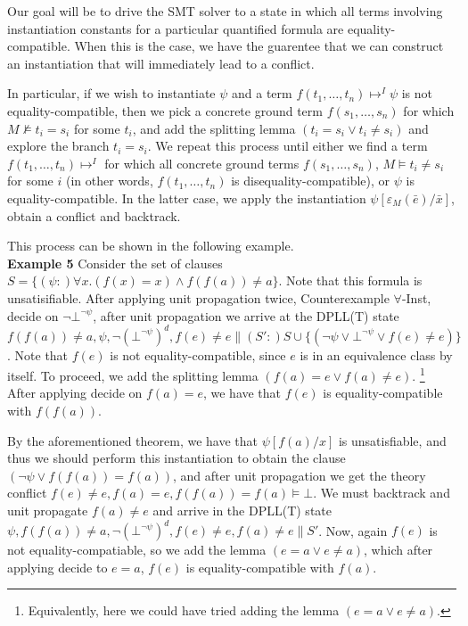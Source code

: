 \documentclass{llncs}
\begin{document}
Our goal will be to drive the SMT solver to a state in which all terms involving instantiation constants for a particular quantified formula are equality-compatible.
When this is the case, we have the guarentee that we can construct an instantiation that will immediately lead to a conflict.

In particular, if we wish to instantiate $\psi$ and a term $f( t_1, \ldots, t_n ) \mapsto^I \psi$ is not equality-compatible, then we pick a concrete ground term $f( s_1, \ldots, s_n )$ for which $M \not\models t_i = s_i$ for some $t_i$, and add the splitting lemma $( t_i = s_i \vee t_i \neq s_i )$ and explore the branch $t_i = s_i$.
We repeat this process until either we find a term $f( t_1, \ldots, t_n ) \mapsto^I$ for which all concrete ground terms $f( s_1, \ldots, s_n )$, $M \models t_i \neq s_i$ for some $i$ (in other words, $f( t_1, \ldots, t_n )$ is disequality-compatible), or $\psi$ is equality-compatible.
In the latter case, we apply the instantiation $\psi[\varepsilon_M(\bar{e})/\bar{x}]$, obtain a conflict and backtrack.

This process can be shown in the following example. \\

{\bf Example 5}
Consider the set of clauses $S = \{ (\psi :)\forall x. (f( x ) = x) \wedge f( f( a ) ) \neq a \}$.  Note that this formula is unsatisifiable.
After applying unit propagation twice, Counterexample $\forall$-Inst, decide on $\neg \bot^{\neg \psi}$, after unit propagation we arrive at the DPLL(T) state $f( f( a ) ) \neq a, \psi, \neg (\bot^{\neg \psi})^d, f(e) \neq e \parallel (S':)S \cup \{ ( \neg \psi \vee \bot^{\neg \psi } \vee f( e ) \neq e ) \}$.
Note that $f( e )$ is not equality-compatible, since $e$ is in an equivalence class by itself.
To proceed, we add the splitting lemma $( f( a ) = e \vee f( a ) \neq e )$. \footnote{ Equivalently, here we could have tried adding the lemma $( e = a \vee e \neq a )$. }
After applying decide on $f( a ) = e$, we have that $f( e )$ is equality-compatible with $f( f( a ) )$.

By the aforementioned theorem, we have that $\psi [ f( a )/x ]$ is unsatisfiable, and thus we should perform this instantiation to obtain the clause $( \neg \psi \vee f( f( a ) ) = f( a ) )$, and after unit propagation we get the theory conflict $f( e ) \neq e, f( a ) = e, f( f( a ) ) = f( a ) \models \bot$.
We must backtrack and unit propagate $f( a ) \neq e$ and arrive in the DPLL(T) state $\psi, f( f( a ) ) \neq a, \neg (\bot^{\neg \psi})^d, f(e) \neq e, f( a ) \neq e \parallel S'$.
Now, again $f( e )$ is not equality-compatiable, so we add the lemma $( e = a \vee e \neq a )$, which after applying decide to $e = a$, $f( e )$ is equality-compatible with $f( a )$.
\end{document}
